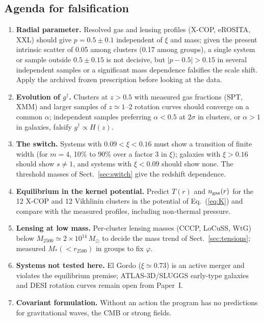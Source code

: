 \documentclass[11pt,a4paper]{article}
\newcommand{\gdag}{g^{\dagger}}
\newcommand{\Msun}{M_\odot}
\begin{document}
\subsection{Agenda for falsification}
\begin{enumerate}[leftmargin=2em,itemsep=0.1em]
\item \textbf{Radial parameter.} Resolved gas and lensing profiles (X-COP, eROSITA, XXL) should give $p=0.5\pm0.1$ independent of $\xi$ and mass; given the present intrinsic scatter of 0.05 among clusters (0.17 among groups), a single system or sample outside $0.5\pm0.15$ is not decisive, but $|p-0.5|>0.15$ in several independent samples or a significant mass dependence falsifies the scale shift. Apply the archived frozen prescription before looking at the data.
\item \textbf{Evolution of $\gdag$.} Clusters at $z>0.5$ with measured gas fractions (SPT, XMM) and larger samples of $z\simeq1$--2 rotation curves should converge on a common $\alpha$; independent samples preferring $\alpha<0.5$ at $2\sigma$ in clusters, or $\alpha>1$ in galaxies, falsify $\gdag\propto H(z)$.
\item \textbf{The switch.} Systems with $0.09<\xi<0.16$ must show a transition of finite width (for $m=4$, 10\% to 90\% over a factor 3 in $\xi$); galaxies with $\xi>0.16$ should show $s\neq1$, and systems with $\xi<0.09$ should show none. The threshold masses of Sect.~\ref{sec:switch} give the redshift dependence.
\item \textbf{Equilibrium in the kernel potential.} Predict $T(r)$ and $n_{\rm gas}(r)$ for the 12 X-COP and 12 Vikhlinin clusters in the potential of Eq.~(\ref{eq:K}) and compare with the measured profiles, including non-thermal pressure.
\item \textbf{Lensing at low mass.} Per-cluster lensing masses (CCCP, LoCuSS, WtG) below $M_{2500}\simeq2\times10^{14}\,\Msun$ to decide the mass trend of Sect.~\ref{sec:tensions}; measured $M_*(<r_{2500})$ in groups to fix $\varphi$.
\item \textbf{Systems not tested here.} El Gordo ($\xi\simeq0.73$) is an active merger and violates the equilibrium premise; ATLAS-3D/SLUGGS early-type galaxies and DESI rotation curves remain open from Paper~I.
\item \textbf{Covariant formulation.} Without an action the program has no predictions for gravitational waves, the CMB or strong fields.
\end{enumerate}

\end{document}
